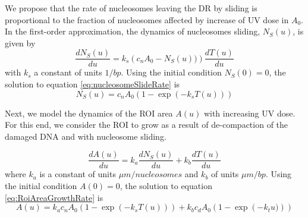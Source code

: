 \documentclass[12pt]{article}
\begin{document}
	We propose that the rate of nucleosomes leaving the DR by sliding is proportional to the fraction of nucleosomes affected by increase of UV dose in $A_0$. In the first-order approximation, the dynamics of nucleosomes sliding, $N_S(u)$, is given by
	\begin{equation}\label{eq:nucleosomeSlideRate}
	\frac{dN_S(u)}{du} = k_s\left( c_nA_0-N_S(u))\right)\frac{dT(u)}{du}	 
	\end{equation}
	with $k_s$ a constant of units $1/bp$. Using the initial condition $N_S(0)=0$, the solution to equation \eqref{eq:nucleosomeSlideRate} is 
	\begin{equation}\label{eq:nucleosomeSlideDR}
	N_S(u)= c_nA_0\left(1-\exp\left(-k_sT(u)\right)\right)
	\end{equation}
	
%	 
	Next, we model the dynamics of the ROI area $A(u)$ with increasing UV
	dose. For this end, we consider the ROI to grow as a result of de-compaction of the damaged DNA and with nucleosome sliding. 
			
	\begin{equation}\label{eq:RoiAreaGrowthRate}
	\frac{dA(u)}{du}=k_a\frac{dN_S(u)}{du}+k_b\frac{dT(u)}{du}
	\end{equation}
	where $k_a$ is a constant of units $\mu m/ nucleosomes$ and $k_b$ of units $\mu m/ bp$. Using the initial condition $A(0) = 0$, the solution to equation \eqref{eq:RoiAreaGrowthRate} is
	\begin{equation}\label{eq:RoiArea}
	A(u) = k_ac_nA_0\left(1-\exp\left(-k_sT(u)\right)\right)+k_bc_dA_0\left(1-\exp\left(-k_tu)\right)\right)
	\end{equation}
	
\end{document}
